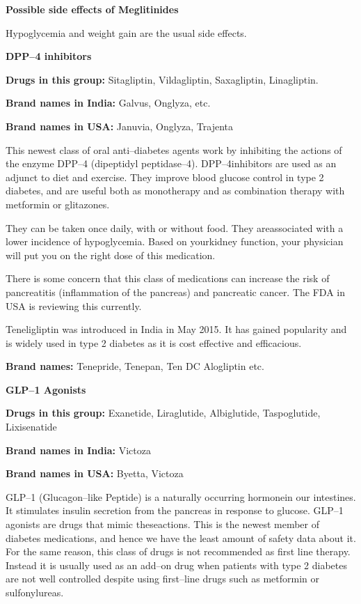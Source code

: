 \vskip 4pt
\noindent\textbf{Possible side effects of Meglitinides}
\vskip 4pt

Hypoglycemia and weight gain are the usual side effects.

\textbf{DPP–4 inhibitors}

\textbf{Drugs in this group:} Sitagliptin, Vildagliptin, Saxagliptin, Linag\-liptin.

\textbf{Brand names in India:} Galvus, Onglyza, etc.

\textbf{Brand names in USA:} Januvia, Onglyza, Trajenta


This newest class of oral anti–diabetes agents work by inhibi\-ting the actions of the enzyme DPP–4 (dipeptidyl peptidase–4). DPP–4\break inhibitors are used as an adjunct to diet and exercise. They improve blood glucose control in type 2 diabetes, and are useful both as mono\-therapy and as combination therapy with metformin or glitazones.

They can be taken once daily, with or without food. They are\break associated with a lower incidence of hypoglycemia. Based on your\break kidney function, your physician will put you on the right dose of this medication.

There is some concern that this class of medications can increase the risk of pancreatitis (inflammation of the pancreas) and pancreatic cancer. The FDA in USA is reviewing this currently.

Teneligliptin was introduced in India in May 2015. It has gained popularity and is widely used in type 2 diabetes as it is cost effective and efficacious.

\textbf{Brand names:} Tenepride, Tenepan, Ten DC Alogliptin etc.

\textbf{GLP–1 Agonists}

\textbf{Drugs in this group:} Exanetide, Liraglutide, Albiglutide, Taspo\-glutide, Lixisenatide

\textbf{Brand names in India:} Victoza

\textbf{Brand names in USA:} Byetta, Victoza



GLP–1 (Glucagon–like Peptide) is a naturally occurring hormone\break in our intestines. It stimulates insulin secretion from the pancreas in response to glucose. GLP–1 agonists are drugs that mimic these\break actions. This is the newest member of diabetes medications, and hence we have the least amount of safety data about it. For the same reason, this class of drugs is not recommended as first line therapy. Instead it is usually used as an add–on drug when patients with type 2 diabetes are not well controlled despite using first–line drugs such as metformin or sulfonylureas.



